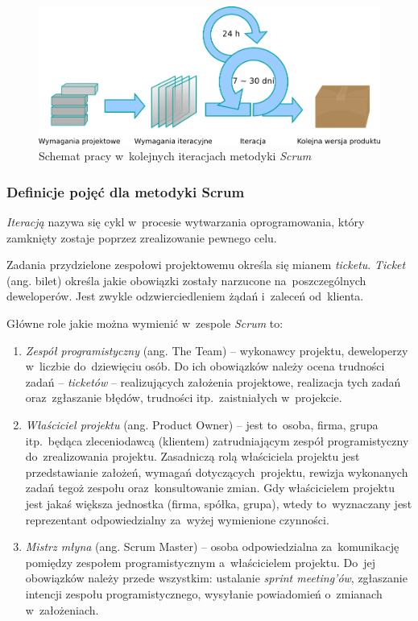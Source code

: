 \begin{figure}[!t]
\centering
\includegraphics[width=\textwidth]{obrazki/scrum.png}
\caption{Schemat pracy w~kolejnych iteracjach metodyki \textit{Scrum} \cite{scrum.schema}}
\label{fig.rysunek.scrum}
\end{figure}

\subsubsection{Definicje pojęć dla metodyki Scrum} \label{scrum.definicje}

\textit{Iteracją} nazywa się cykl w~procesie wytwarzania oprogramowania, który zamknięty zostaje poprzez zrealizowanie pewnego celu.


Zadania przydzielone zespołowi projektowemu określa się mianem \textit{ticketu}. \textit{Ticket} (ang. bilet) określa jakie obowiązki zostały narzucone na~poszczególnych deweloperów. Jest zwykle odzwierciedleniem żądań i~zaleceń od~klienta.


Główne role jakie można wymienić w~zespole \textit{Scrum} to:

\begin{enumerate}
  \item \textit{Zespół programistyczny} (ang. The Team) -- wykonawcy projektu, deweloperzy w~liczbie do~dziewięciu osób. Do ich obowiązków należy ocena trudności zadań -- \textit{ticketów} -- realizujących założenia projektowe, realizacja tych zadań oraz~zgłaszanie błędów, trudności itp.~zaistniałych w~projekcie.
  \item \textit{Właściciel projektu} (ang. Product Owner) -- jest to~osoba, firma, grupa itp.~będąca zleceniodawcą (klientem) zatrudniającym zespół programistyczny do~zrealizowania projektu. Zasadniczą rolą właściciela projektu jest przedstawianie założeń, wymagań dotyczących~projektu, rewizja wykonanych zadań tegoż zespołu oraz~konsultowanie zmian. Gdy właścicielem projektu jest jakaś większa jednostka (firma, spółka, grupa), wtedy to~wyznaczany jest reprezentant odpowiedzialny za~wyżej wymienione czynności.
  \item \textit{Mistrz młyna} (ang. Scrum Master) -- osoba odpowiedzialna za~komunikację pomiędzy zespołem programistycznym a~właścicielem projektu. Do~jej obowiązków należy przede wszystkim: ustalanie \textit{sprint meeting'ów}, zgłaszanie intencji zespołu programistycznego, wysyłanie powiadomień o~zmianach w~założeniach.
\end{enumerate}

